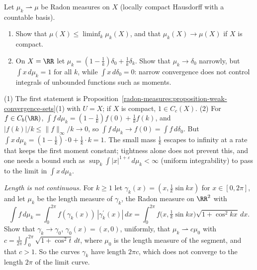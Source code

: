 \begin{exercise}\label{radon-measures:exercise-weak-mass}
Let $\mu_k \rightharpoonup \mu$ be Radon measures on $X$ (locally compact Hausdorff with a countable basis).
\begin{enumerate}
\item Show that $\mu(X) \leq \liminf_k\mu_k(X)$, and that $\mu_k(X) \to \mu(X)$ if $X$ is compact.
\item On $X = \RR$ let $\mu_k = (1 - \frac1k)\delta_0 + \frac1k\delta_k$. Show that $\mu_k \to \delta_0$ narrowly, but $\int x\,d\mu_k = 1$ for all $k$, while
$\int x\,d\delta_0 = 0$: narrow convergence does not control integrals of unbounded functions such as moments.
\end{enumerate}
\end{exercise}

\begin{solution}
(1) The first statement is Proposition~\ref{radon-measures:proposition-weak-convergence-sets}(1) with $U = X$; if $X$ is compact, $1 \in C_c(X)$. (2) For $f \in C_b(\RR)$,
$\int f\,d\mu_k = (1 - \frac1k)f(0) + \frac1kf(k)$, and $|f(k)|/k \leq \|f\|_\infty/k \to 0$, so $\int f\,d\mu_k \to f(0) = \int f\,d\delta_0$. But
$\int x\,d\mu_k = (1 - \frac1k)\cdot0 + \frac1k\cdot k = 1$. The small mass $\frac1k$ escapes to infinity at a rate that keeps the first moment constant; tightness alone does not prevent
this, and one needs a bound such as $\sup_k\int|x|^{1 + \varepsilon}\,d\mu_k < \infty$ (uniform integrability) to pass to the limit in $\int x\,d\mu_k$.
\end{solution}

\begin{exercise}\label{radon-measures:exercise-staircase}
\emph{Length is not continuous.} For $k \geq 1$ let $\gamma_k(x) = (x, \frac1k\sin kx)$ for $x \in [0, 2\pi]$, and let $\mu_k$ be the length measure of $\gamma_k$, the Radon measure on $\RR^2$ with
\[
\int f\,d\mu_k = \int_0^{2\pi}f(\gamma_k(x))\,|\gamma_k^{\prime}(x)|\,dx = \int_0^{2\pi}f\bigl(x, \tfrac1k\sin kx\bigr)\sqrt{1 + \cos^2kx}\,dx .
\]
Show that $\gamma_k \to \gamma_0$, $\gamma_0(x) = (x, 0)$, uniformly, that $\mu_k \rightharpoonup c\mu_0$ with $c = \frac1{2\pi}\int_0^{2\pi}\sqrt{1 + \cos^2t}\,dt$, where $\mu_0$ is the length measure of the
segment, and that $c > 1$. So the curves $\gamma_k$ have length $2\pi c$, which does not converge to the length $2\pi$ of the limit curve.
\end{exercise}

